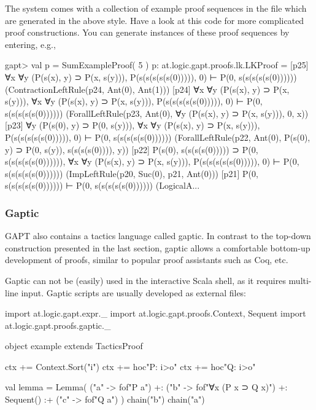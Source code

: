 \documentclass[a4paper,11pt]{article}
\newcommand{\cli}[1]{{\ttfamily {#1}}}
\begin{document}
The system comes with a collection of example proof sequences in the file
\cli{examples/ProofSequences.scala} which are generated in the above style.
Have a look at this code for more complicated proof constructions.
You can generate instances of these proof sequences by entering, e.g.,
\begin{clilisting}
gapt> val p = SumExampleProof( 5 )
p: at.logic.gapt.proofs.lk.LKProof =
[p25] ∀x ∀y (P(s(x), y) ⊃ P(x, s(y))),
P(s(s(s(s(s(0))))), 0)
⊢
P(0, s(s(s(s(s(0))))))    (ContractionLeftRule(p24, Ant(0), Ant(1)))
[p24] ∀x ∀y (P(s(x), y) ⊃ P(x, s(y))),
∀x ∀y (P(s(x), y) ⊃ P(x, s(y))),
P(s(s(s(s(s(0))))), 0)
⊢
P(0, s(s(s(s(s(0))))))    (ForallLeftRule(p23, Ant(0), ∀y (P(s(x), y) ⊃ P(x, s(y))), 0, x))
[p23] ∀y (P(s(0), y) ⊃ P(0, s(y))),
∀x ∀y (P(s(x), y) ⊃ P(x, s(y))),
P(s(s(s(s(s(0))))), 0)
⊢
P(0, s(s(s(s(s(0))))))    (ForallLeftRule(p22, Ant(0), P(s(0), y) ⊃ P(0, s(y)), s(s(s(s(0)))), y))
[p22] P(s(0), s(s(s(s(0))))) ⊃ P(0, s(s(s(s(s(0)))))),
∀x ∀y (P(s(x), y) ⊃ P(x, s(y))),
P(s(s(s(s(s(0))))), 0)
⊢
P(0, s(s(s(s(s(0))))))    (ImpLeftRule(p20, Suc(0), p21, Ant(0)))
[p21] P(0, s(s(s(s(s(0)))))) ⊢ P(0, s(s(s(s(s(0))))))    (LogicalA...
\end{clilisting}

\subsubsection{Gaptic}

GAPT also contains a tactics language called gaptic.  In contrast to the
top-down construction presented in the last section, gaptic allows a
comfortable bottom-up development of proofs, similar to popular proof
assistants such as Coq, etc.

Gaptic can not be (easily) used in the interactive Scala shell, as it requires
multi-line input.  Gaptic scripts are usually developed as external files:
\begin{tacticslisting}
import at.logic.gapt.expr._
import at.logic.gapt.proofs.{Context, Sequent}
import at.logic.gapt.proofs.gaptic._

object example extends TacticsProof {
  ctx += Context.Sort("i")
  ctx += hoc"P: i>o"
  ctx += hoc"Q: i>o"

  val lemma = Lemma(
    ("a" -> fof"P a") +:
    ("b" -> fof"∀x (P x ⊃ Q x)") +:
    Sequent()
    :+ ("c" -> fof"Q a")
  ) {
    chain("b")
    chain("a")
  }
}
\end{tacticslisting}
\begin{tacticsoutput}
\end{tacticsoutput}
\end{document}
